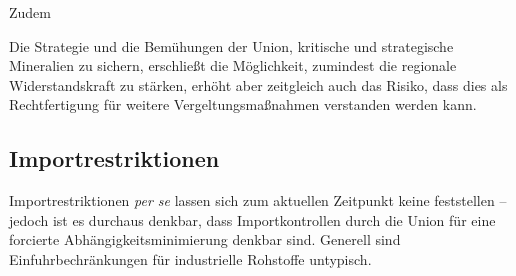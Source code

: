 \documentclass[12pt,a4paper,oneside]{book} %
\begin{document}
Zudem 

Die Strategie und die Bemühungen der Union, kritische und strategische Mineralien zu sichern, erschließt die Möglichkeit, zumindest die regionale Widerstandskraft zu stärken, erhöht aber zeitgleich auch das Risiko, dass dies als Rechtfertigung für weitere Vergeltungsmaßnahmen verstanden werden kann.\autocite[siehe auch]{Schroeder, Patrick: Letter: Race for critical minerals sparks call for new materials agency, FT, July 14 2025}



\subsection{Importrestriktionen}
Importrestriktionen \textit{per se} lassen sich zum aktuellen Zeitpunkt keine feststellen -- jedoch ist es durchaus denkbar, dass Importkontrollen durch die Union für eine forcierte Abhängigkeitsminimierung denkbar sind. Generell sind Einfuhrbechränkungen für industrielle Rohstoffe untypisch.\autocite{Schorkopf, Rohstoffverwaltung, Rn. 37}
\end{document}
